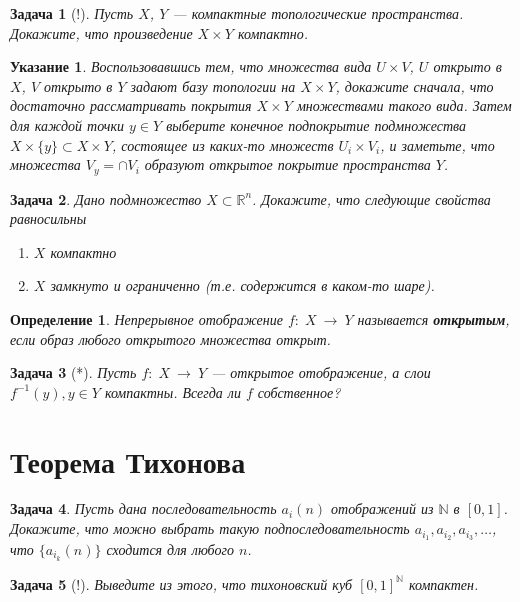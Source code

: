 \documentclass[12pt]{book}
\newcommand{\subs}{\section}
\newcommand{\arrow}{{\:\longrightarrow\:}}
\def\R{{\mathbb R}}
\def\N{{\mathbb N}}
\theoremstyle{upshape}
\newtheorem{zadacha}{Задача}[chapter]
\theoremstyle{generic}
\newtheorem{opredelenie}[teorema]{Определение}
\newtheorem{remark}[teorema]{Замечание}
\def\замечание{\begin{remark}}
\def\еза{\end{remark}}
\theoremstyle{upshapenonumber}
\newtheorem{ukazanie}{Указание}[section]
\renewcommand{\labelenumi}{\ralph{enumi}.}
\newcommand{\следствие}{%
     \refstepcounter{teorema}
     {\noindent\bf Следствие \thechapter.\arabic{teorema}:\ }}
\newcommand{\пример}{%
     \refstepcounter{teorema}
     {\noindent\bf Пример \thechapter.\arabic{teorema}:\ }}
\newcommand{\лемма}{%
     \refstepcounter{teorema}
     {\noindent\bf Лемма \thechapter.\arabic{teorema}:\ }}
\newcommand{\теорема}{%
     \refstepcounter{teorema}
     {\noindent\bf Теорема \thechapter.\arabic{teorema}:\ }}
\newcommand{\утверждение}{%
     \refstepcounter{teorema}
     {\noindent\bf Утверждение \thechapter.\arabic{teorema}:\ }}
\def\бф{\bf}
\def\ем{\em}
\def\задача{\begin{zadacha}}
\def\ез{\end{zadacha}}
\def\еу{\end{ukazanie}}
\def\определение{\begin{opredelenie}}
\def\ео{\end{opredelenie}}
\def\енум{\begin{enumerate}}
\def\ее{\end{enumerate}}
\begin{document}
{%


\begin{zadacha}[!]
Пусть $X$, $Y$ --- компактные топологические пространства. Докажите,
что произведение $X \times Y$ компактно.
\end{zadacha}

\begin{ukazanie}
Воспользовавшись тем, что множества вида $U \times V$, $U$ 
открыто в $X$, $V$ открыто в $Y$ задают базу топологии на 
$X \times Y$, докажите сначала, что достаточно рассматривать 
покрытия $X \times Y$ множествами такого вида. Затем для каждой 
точки $y \in Y$ выберите конечное подпокрытие подмножества
$X \times \{y\} \subset X \times Y$, состоящее из каких-то
множеств $U_i \times V_i$, и заметьте, что множества 
$V_y = \cap V_i$ образуют открытое покрытие
пространства $Y$.
\end{ukazanie}

\begin{zadacha}
Дано подмножество $X\subset \R^n$. Докажите, что 
следующие свойства равносильны
\begin{enumerate}
\renewcommand{\labelenumi}{(\roman{enumi})}
\item $X$ компактно

\item $X$ замкнуто и ограниченно (т.е. содержится
в каком-то шаре).
\end{enumerate}
\end{zadacha}

\определение
Непрерывное отображение $f:\; X\arrow Y$
называется {\бф открытым}, если образ любого
открытого множества открыт.
\ео

\задача[*]
Пусть $f:\; X \arrow Y$ --- открытое отображение,
а слои $f^{-1}(y), y\in Y$ компактны. Всегда ли $f$
собственное?
\ез

\subs{Теорема Тихонова}

\begin{zadacha}
Пусть дана последовательность $a_i(n)$ отображений из $\N$
в $[0,1]$. Докажите, что можно выбрать
такую подпоследовательность $a_{i_1}, a_{i_2}, a_{i_3}, \dots$, 
что $\{a_{i_k}(n)\}$ сходится для любого $n$.
\end{zadacha}

\begin{zadacha}[!]
Выведите из этого, что тихоновский куб $[0,1]^\N$
компактен.
\end{zadacha}

}
\end{document}
